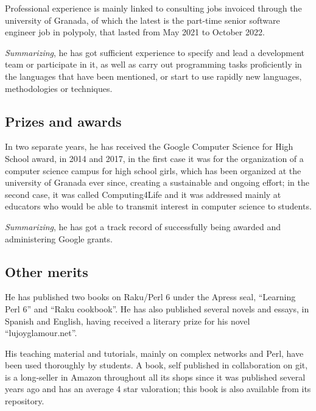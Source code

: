 \documentclass[a4paper,12pt]{article}
\begin{document}
Professional experience is mainly linked to consulting jobs invoiced through the
university of Granada, of which the latest is the part-time senior software
engineer job in polypoly, that lasted from May 2021 to October 2022.

{\em Summarizing}, he has got sufficient experience to specify and lead a development
team or participate in it, as well as carry out programming tasks proficiently
in the languages that have been mentioned, or start to use rapidly new
languages, methodologies or techniques.

\subsection{Prizes and awards}

In two separate years, he has received the Google Computer Science for High
School award, in 2014 and 2017, in the first case it was for the organization of
a computer science campus for high school girls, which has been organized at the
university of Granada ever since, creating a sustainable and ongoing effort; in
the second case, it was called Computing4Life and it was addressed mainly at
educators who would be able to transmit interest in computer science to
students.

{\em Summarizing}, he has got a track record of successfully being awarded and
administering Google grants.

\subsection{Other merits}

He has published two books on Raku/Perl 6 under the Apress seal, ``Learning Perl
6'' and ``Raku cookbook''. He has also published several novels and essays, in
Spanish and English, having received a literary prize for his novel
``lujoyglamour.net''.

His teaching material and tutorials, mainly on complex networks and Perl, have
been used thoroughly by students. A book, self published in collaboration on
git, is a long-seller in Amazon throughout all its shops since it was published
several years ago and has an average 4 star valoration; this book is also
available from its repository.





\end{document}

